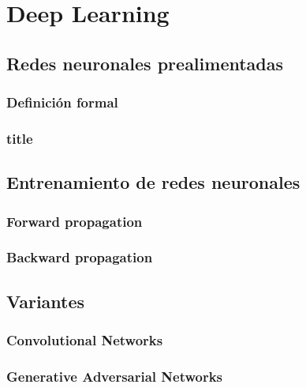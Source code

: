 \chapter{\label{deep-learning}Deep Learning}


\section{Redes neuronales prealimentadas}
\subsection{Definición formal}
\subsection{title}
\section{Entrenamiento de redes neuronales}
\subsection{Forward propagation}
\subsection{Backward propagation}
\section{Variantes}
\subsection{Convolutional Networks}
\subsection{Generative Adversarial Networks}